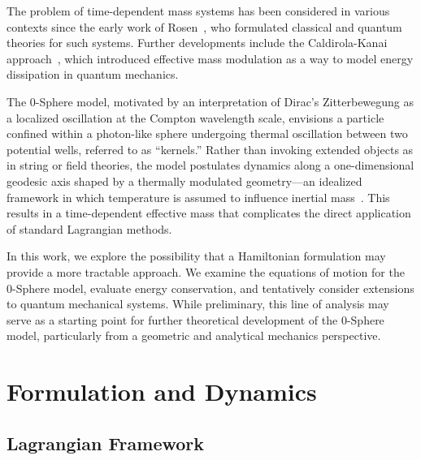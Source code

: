 \documentclass[%
 reprint,
 amsmath,amssymb,
 aps,
]{revtex4-1}
\numberwithin{equation}{section}%
\begin{document}
The problem of time-dependent mass systems has been considered in various contexts since the early work of Rosen~\cite{rosen1965}, who formulated classical and quantum theories for such systems. Further developments include the Caldirola-Kanai approach~\cite{caldirola1941,kanai1948}, which introduced effective mass modulation as a way to model energy dissipation in quantum mechanics.

The 0-Sphere model, motivated by an interpretation of Dirac’s Zitterbewegung as a localized oscillation at the Compton wavelength scale, envisions a particle confined within a photon-like sphere undergoing thermal oscillation between two potential wells, referred to as ``kernels.'' Rather than invoking extended objects as in string or field theories, the model postulates dynamics along a one-dimensional geodesic axis shaped by a thermally modulated geometry—an idealized framework in which temperature is assumed to influence inertial mass~\cite{thermodynamics_inertia}. This results in a time-dependent effective mass that complicates the direct application of standard Lagrangian methods.

In this work, we explore the possibility that a Hamiltonian formulation may provide a more tractable approach. We examine the equations of motion for the 0-Sphere model, evaluate energy conservation, and tentatively consider extensions to quantum mechanical systems. While preliminary, this line of analysis may serve as a starting point for further theoretical development of the 0-Sphere model, particularly from a geometric and analytical mechanics perspective.


\section{Formulation and Dynamics}


\subsection{Lagrangian Framework}
\end{document}
